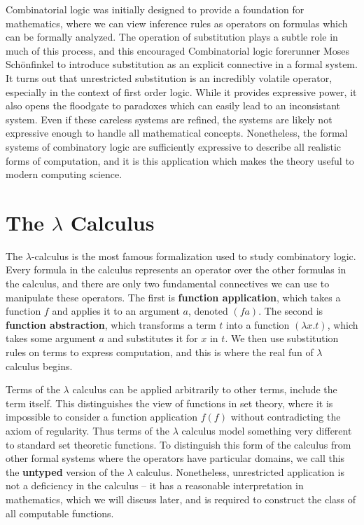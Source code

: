 Combinatorial logic was initially designed to provide a foundation for mathematics, where we can view inference rules as operators on formulas which can be formally analyzed. The operation of substitution plays a subtle role in much of this process, and this encouraged Combinatorial logic forerunner Moses Sch\"{o}nfinkel to introduce substitution as an explicit connective in a formal system. It turns out that unrestricted substitution is an incredibly volatile operator, especially in the context of first order logic. While it provides expressive power, it also opens the floodgate to paradoxes which can easily lead to an inconsistant system. Even if these careless systems are refined, the systems are likely not expressive enough to handle all mathematical concepts. Nonetheless, the formal systems of combinatory logic are sufficiently expressive to describe all realistic forms of computation, and it is this application which makes the theory useful to modern computing science.

\section{The $\lambda$ Calculus}

The $\lambda$-calculus is the most famous formalization used to study combinatory logic. Every formula in the calculus represents an operator over the other formulas in the calculus, and there are only two fundamental connectives we can use to manipulate these operators. The first is {\bf function application}, which takes a function $f$ and applies it to an argument $a$, denoted $(f a)$. The second is {\bf function abstraction}, which transforms a term $t$ into a function $(\lambda x.t)$, which takes some argument $a$ and substitutes it for $x$ in $t$. We then use substitution rules on terms to express computation, and this is where the real fun of $\lambda$ calculus begins.

Terms of the $\lambda$ calculus can be applied arbitrarily to other terms, include the term itself. This distinguishes the view of functions in set theory, where it is impossible to consider a function application $f(f)$ without contradicting the axiom of regularity. Thus terms of the $\lambda$ calculus model something very different to standard set theoretic functions. To distinguish this form of the calculus from other formal systems where the operators have particular domains, we call this the {\bf untyped} version of the $\lambda$ calculus. Nonetheless, unrestricted application is not a deficiency in the calculus -- it has a reasonable interpretation in mathematics, which we will discuss later, and is required to construct the class of all computable functions.

